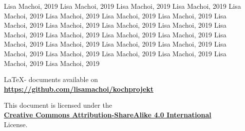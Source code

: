 \documentclass[10pt,a4paper]{article}
\begin{document}
\newpage
\renewcommand{\refname}{\textsc{References:}}
\begin{thebibliography}{9}
	 Lisa Machoi, 2019
	 Lisa Machoi, 2019
	 Lisa Machoi, 2019
	 Lisa Machoi, 2019
	 Lisa Machoi, 2019
	 Lisa Machoi, 2019
	 Lisa Machoi, 2019
	 Lisa Machoi, 2019
	 Lisa Machoi, 2019
	 Lisa Machoi, 2019
	 Lisa Machoi, 2019
	 Lisa Machoi, 2019
	 Lisa Machoi, 2019
	 Lisa Machoi, 2019
	 Lisa Machoi, 2019
	 Lisa Machoi, 2019
	 Lisa Machoi, 2019
	 Lisa Machoi, 2019
	 Lisa Machoi, 2019
	 Lisa Machoi, 2019
	 Lisa Machoi, 2019
	 Lisa Machoi, 2019
	 Lisa Machoi, 2019
	 Lisa Machoi, 2019
	 Lisa Machoi, 2019
	 Lisa Machoi, 2019
\end{thebibliography}
\vspace{1cm}
\begin{center}
	\LaTeX - documents available on\\ \href{https://github.com/lisamachoi/kochprojekt}{\textbf{https://github.com/lisamachoi/kochprojekt}}
	
	\vspace{1cm}
	
	This document is licensed under the\\ \href{https://creativecommons.org/licenses/by-sa/4.0/}{\textbf{Creative Commons Attribution-ShareAlike 4.0 International}}\\
	License.

	\vspace{1cm}

	{\huge\ccbysa}
\end{center}
\end{document}
